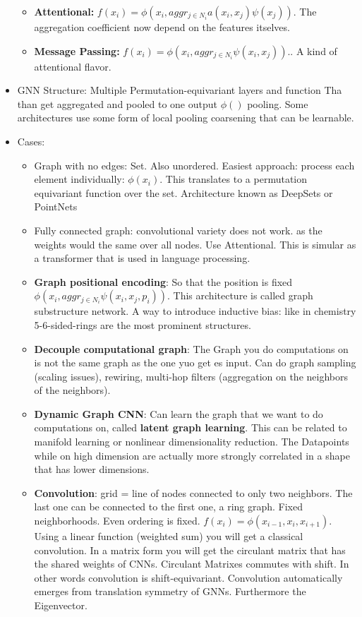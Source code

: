 \begin{itemize}[noitemsep,nolistsep]
\begin{itemize}[noitemsep,nolistsep]
		\item \textbf{Attentional:}  $f(x_i) = \phi(x_i, aggr_{j \in N_i} a(x_i,x_j) \psi(x_j)).$ The aggregation coefficient now depend on the features itselves. 
		\item \textbf{Message Passing:} $f(x_i) = \phi(x_i, aggr_{j \in N_i} \psi(x_i,x_j)).$. A kind of attentional flavor.
	\end{itemize}
	\item GNN Structure: Multiple Permutation-equivariant layers and function Tha than get aggregated and pooled to one output $\phi()$ pooling. Some architectures use some form of local pooling coarsening that can be learnable.
	\item Cases:
	\begin{itemize}[noitemsep,nolistsep]
		\item Graph with no edges: Set. Also unordered. Easiest approach: process each element individually: $\phi(x_i)$. This translates to a permutation equivariant function over the set. Architecture known as DeepSets or PointNets
		\item Fully connected graph: convolutional variety does not work. as the weights would the same over all nodes. Use Attentional. This is simular as a transformer that is used in language processing.
		\item \textbf{Graph positional encoding}: So that the position is fixed $\phi(x_i, aggr_{j \in N_i} \psi(x_i, x_j, p_i)).$ This architecture is called graph substructure network. A way to introduce inductive bias: like in chemistry 5-6-sided-rings are the most prominent structures. 
		\item \textbf{Decouple computational graph}: The Graph you do computations on is not the same graph as the one yuo get es input. Can do graph sampling (scaling issues), rewiring, multi-hop filters (aggregation on  the neighbors of the neighbors). 
		\item \textbf{Dynamic Graph CNN}: Can learn the graph that we want to do computations on, called \textbf{latent graph learning}. This can be related to manifold learning or nonlinear dimensionality reduction. The Datapoints while on high dimension are actually more strongly correlated in a shape that has lower dimensions.
		\item \textbf{Convolution}: grid = line of nodes connected to only two neighbors. The last one can be connected to the first one, a ring graph. Fixed neighborhoods. Even ordering is fixed. $f(x_i) = \phi(x_{i-1},x_i,x_{i+1})$. Using a linear function (weighted sum) you will get a classical convolution. In a matrix form you will get the circulant matrix that has the shared weights of CNNs. Circulant Matrixes commutes with shift. In other words convolution is shift-equivariant. Convolution automatically emerges from translation symmetry of GNNs. Furthermore the Eigenvector. 

\end{itemize}
\end{itemize}
